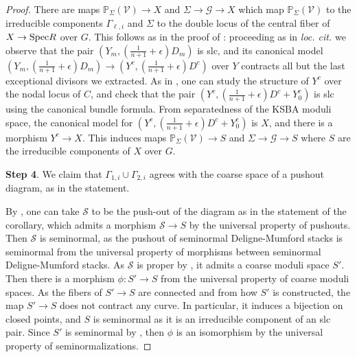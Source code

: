 \documentclass[a4paper,12pt]{amsart}
\newcommand{\bP}{{\mathbb P}}
\newcommand{\cG}{{\mathcal{G}}}
\newcommand{\cV}{{\mathcal{V}}}
\newcommand\spec{\text{\rm Spec}}
\newcommand\cS{{\mathcal{S}}}
\theoremstyle{definition}
\theoremstyle{remark}
\begin{document}
\begin{proof}
There are maps $\bP_\Sigma(\cV)\to X$ and $\Sigma\to \cG\to X$ which map $\bP_\Sigma(\cV)$ to the irreducible components $\Gamma_{\ell,i}$ and $\Sigma$ to the double locus of the central fiber of $X\to \spec R$ over $G$.
This follows as in the proof of : proceeding as in \textit{loc. cit.} we observe that the pair $(Y_m,(\frac{1}{n+1}+\epsilon )D_m)$ is slc, and its canonical model $(Y_m,(\frac{1}{n+1}+\epsilon )D_m)\to (Y^c,(\frac{1}{n+1}+\epsilon)D^c)$
   over $Y$ contracts all but the last exceptional divisors we extracted. As in , one can study the structure of $Y^c$ over the nodal locus of $C$, and check that the pair $(Y^c,(\frac{1}{n+1}+\epsilon)D^c+Y^c_0)$ is slc using the canonical bundle formula. From separatedness of the KSBA moduli space, the canonical model for $(Y^c,(\frac{1}{n+1}+\epsilon)D^c+Y^c_0)$ is $X$, and there is a morphism $Y^c\to X$. This induces maps $\bP_\Sigma(\cV)\to S$ and $\Sigma\to \cG\to S$ where $S$ are the irreducible components of $X$ over $G$. 

\textbf{Step 4}. We claim that $\Gamma_{1,i}\cup\Gamma_{2,i}$ agrees with the coarse space of a pushout diagram, as in the statement.
   
   By \cite[Theorem 1.8]{alper2024artin}, one can take $\cS$ to be the push-out of the diagram as in the statement of the corollary, which admits a morphism $\cS\to S$ by the universal property of pushouts. Then $\cS$ is seminormal, as the pushout of seminormal Deligne-Mumford stacks is seminormal from the universal property of morphisms between seminormal Deligne-Mumford stacks.
   As $\cS$ is proper by \cite[Theorem A.4(viii)]{Rydh}, it admits a coarse moduli space $S'$. Then there is a morphism $\phi\colon S'\rightarrow S$ from the universal property of coarse moduli spaces.
    As the fibers of $S'\to S$ are connected and from how $S'$ is constructed, the map $S'\to S$ does not contract any curve. In particular, it induces a bijection on closed points, and $S$ is seminormal as it is an irreducible component of an slc pair. Since $S'$ is seminormal by , then $\phi$ is an isomorphism by the universal property of seminormalizations.


\end{proof}
\end{document}
